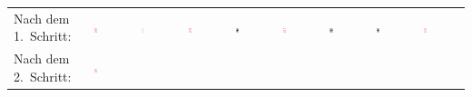 \begin{tabular}{m{30mm}m{11mm}m{11mm}m{11mm}m{11mm}m{11mm}m{11mm}m{11mm}m{11mm}}
\\
Nach dem 1.\ Schritt: &
\includegraphics[width=0.08\textwidth]{./inf/SEKII/19_Java_Sortierverfahren/Herz8.png}
&
\includegraphics[width=0.08\textwidth]{./inf/SEKII/19_Java_Sortierverfahren/HerzAs.png}
&
\includegraphics[width=0.08\textwidth]{./inf/SEKII/19_Java_Sortierverfahren/Herz10.png}
&
\includegraphics[width=0.08\textwidth]{./inf/SEKII/19_Java_Sortierverfahren/HerzBube.png}
&
\includegraphics[width=0.08\textwidth]{./inf/SEKII/19_Java_Sortierverfahren/Herz7.png}
&
\includegraphics[width=0.08\textwidth]{./inf/SEKII/19_Java_Sortierverfahren/HerzKoenig.png}
&
\includegraphics[width=0.08\textwidth]{./inf/SEKII/19_Java_Sortierverfahren/HerzDame.png}
&
\includegraphics[width=0.08\textwidth]{./inf/SEKII/19_Java_Sortierverfahren/Herz9.png}
\\
Nach dem 2.\ Schritt: &
\includegraphics[width=0.08\textwidth]{./inf/SEKII/19_Java_Sortierverfahren/Herz8.png}

\end{tabular}
